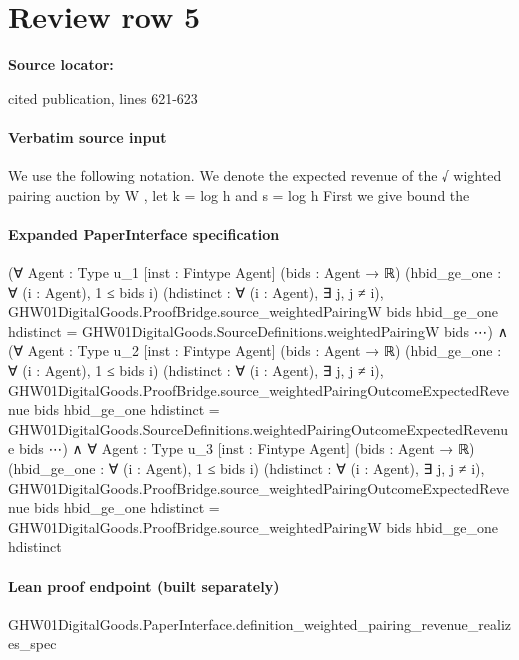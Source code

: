 \documentclass[10pt]{article}
\begin{document}
\section*{Review row 5}
\textbf{Source locator:} {\footnotesize\raggedright cited publication, lines 621-\allowbreak{}623\par}
\paragraph{Verbatim source input}
\begin{ReviewVerbatim}
We use the following notation. We denote the expected revenue of the √
wighted pairing auction by W ,
let k = log h and s = log h First we give bound the
\end{ReviewVerbatim}


\paragraph{Expanded PaperInterface specification}
\begin{ReviewVerbatim}
(∀ {Agent : Type u_1} [inst : Fintype Agent] (bids : Agent → ℝ) (hbid_ge_one : ∀ (i : Agent), 1 ≤ bids i)
    (hdistinct : ∀ (i : Agent), ∃ j, j ≠ i),
    GHW01DigitalGoods.ProofBridge.source_weightedPairingW bids hbid_ge_one hdistinct =
      GHW01DigitalGoods.SourceDefinitions.weightedPairingW bids ⋯) ∧
  (∀ {Agent : Type u_2} [inst : Fintype Agent] (bids : Agent → ℝ) (hbid_ge_one : ∀ (i : Agent), 1 ≤ bids i)
      (hdistinct : ∀ (i : Agent), ∃ j, j ≠ i),
      GHW01DigitalGoods.ProofBridge.source_weightedPairingOutcomeExpectedRevenue bids hbid_ge_one hdistinct =
        GHW01DigitalGoods.SourceDefinitions.weightedPairingOutcomeExpectedRevenue bids ⋯) ∧
    ∀ {Agent : Type u_3} [inst : Fintype Agent] (bids : Agent → ℝ) (hbid_ge_one : ∀ (i : Agent), 1 ≤ bids i)
      (hdistinct : ∀ (i : Agent), ∃ j, j ≠ i),
      GHW01DigitalGoods.ProofBridge.source_weightedPairingOutcomeExpectedRevenue bids hbid_ge_one hdistinct =
        GHW01DigitalGoods.ProofBridge.source_weightedPairingW bids hbid_ge_one hdistinct
\end{ReviewVerbatim}

\paragraph{Lean proof endpoint (built separately)}\begin{ReviewVerbatim}
GHW01DigitalGoods.PaperInterface.definition_weighted_pairing_revenue_realizes_spec
\end{ReviewVerbatim}
\end{document}
